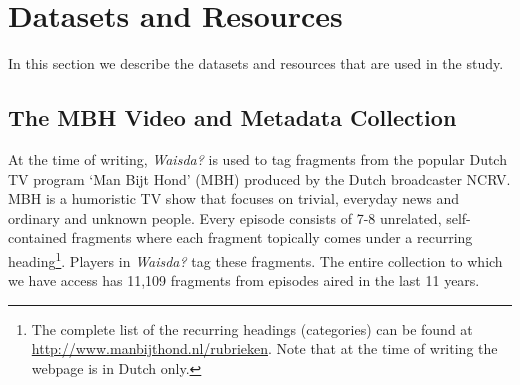 
\section{Datasets and Resources}\label{ecir:sec:materials}
In this section we describe the datasets and resources that are used in the study.
\subsection{The MBH Video and Metadata Collection}\label{sec:video-metadata-collection}
At the time of writing, \textit{Waisda?} is used to %
tag fragments from the popular Dutch TV program `Man Bijt Hond' (MBH) produced by the Dutch broadcaster NCRV.  MBH is a humoristic TV show that focuses on trivial, everyday news and ordinary and unknown people.  Every episode consists of 7-8 unrelated, self-contained fragments where each fragment topically comes under a recurring heading\footnote{The complete list of the recurring headings (categories) can be found at \url{http://www.manbijthond.nl/rubrieken}. Note that at the time of writing the webpage is in Dutch only.}. Players in \textit{Waisda?} tag these fragments.  The entire collection to which we have access has 11,109 fragments from episodes aired in the last 11 years.

